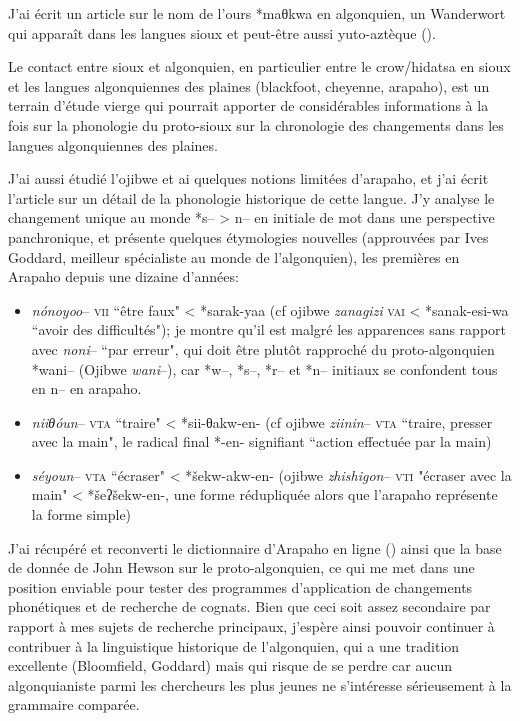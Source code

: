 \documentclass[oldfontcommands,oneside,a4paper,11pt]{memoir}
\begin{document}
J'ai écrit un article sur le nom de l'ours *maθkwa en algonquien, un Wanderwort qui apparaît dans les langues sioux et peut-être aussi yuto-aztèque (\citealt{jacques12bear}).

Le contact entre sioux et algonquien, en particulier entre le crow/hidatsa en sioux et les langues algonquiennes des plaines (blackfoot, cheyenne, arapaho), est un terrain d'étude vierge qui pourrait apporter de considérables informations à la fois sur la phonologie du proto-sioux sur la chronologie des changements dans les langues algonquiennes des plaines.


J'ai aussi étudié l'ojibwe et ai quelques notions limitées d'arapaho, et j'ai écrit l'article \citet{jacques13arapaho} sur un détail de la phonologie historique de cette langue. J'y analyse le changement unique au monde *s-- > n-- en initiale de mot dans une perspective panchronique, et présente quelques étymologies nouvelles (approuvées par Ives Goddard, meilleur spécialiste au monde de l'algonquien), les premières en Arapaho depuis une dizaine d'années:
\begin{itemize}
\item  \textit{nónoyoo}-- \textsc{vii} ``être faux" < *sarak-yaa (cf ojibwe \textit{zanagizi} \textsc{vai} < *sanak-esi-wa ``avoir des difficultés"); je montre qu'il est malgré les apparences sans rapport avec \textit{noni}-- ``par erreur", qui doit être plutôt rapproché du proto-algonquien *wani-- (Ojibwe \textit{wani}--), car *w--, *s--, *r-- et *n-- initiaux se confondent tous en n-- en arapaho.

\item  \textit{niiθóun}-- \textsc{vta} ``traire" < *sii-θakw-en- (cf ojibwe \textit{ziinin}-- \textsc{vta} ``traire, presser avec la main", le radical final *-en- signifiant ``action effectuée par la main)

\item \textit{séyoun}-- \textsc{vta} ``écraser" < *šekw-akw-en- (ojibwe \textit{zhishigon}-- \textsc{vti} "écraser avec la main" < *šeʔšekw-en-, une forme rédupliquée alors que l'arapaho représente la forme simple)

\end{itemize}
J'ai récupéré et  reconverti le dictionnaire d'Arapaho en ligne (\citealt{conathan06arapaho}) ainsi que la base de donnée de John Hewson sur le proto-algonquien, ce qui me met dans une position enviable pour tester des programmes d'application de changements phonétiques et de recherche de cognats. Bien que ceci soit assez secondaire par rapport à mes sujets de recherche principaux, j'espère ainsi pouvoir continuer à contribuer à la linguistique historique de l'algonquien, qui a une tradition excellente (Bloomfield, Goddard) mais qui risque de se perdre car aucun algonquianiste parmi les chercheurs les plus jeunes ne s'intéresse sérieusement à la grammaire comparée.
\end{document}

